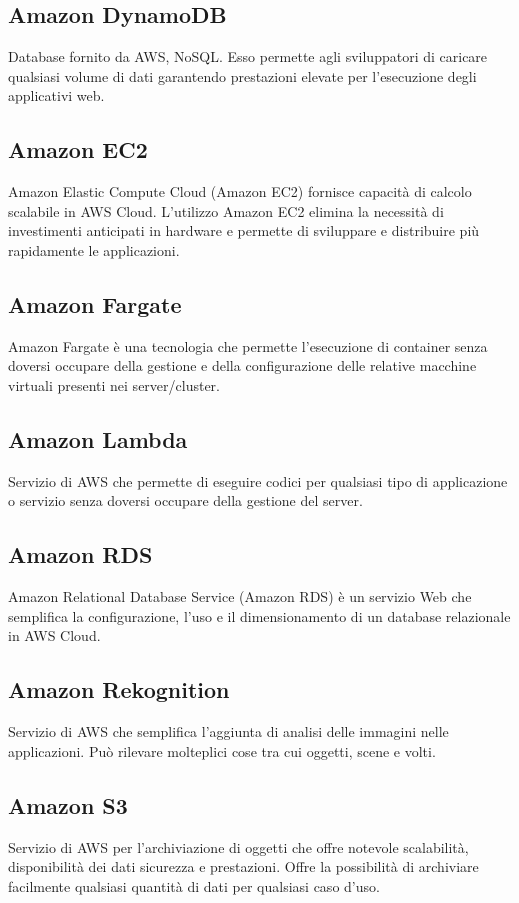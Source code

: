 \documentclass{classes/base}
\begin{document}
        \subsection*{Amazon DynamoDB}
        Database fornito da AWS, NoSQL. Esso permette agli sviluppatori di caricare qualsiasi volume di dati garantendo prestazioni elevate per l'esecuzione degli applicativi web.

        \subsection*{Amazon EC2}
        Amazon Elastic Compute Cloud (Amazon EC2) fornisce capacità di calcolo scalabile in AWS Cloud. L'utilizzo Amazon EC2 elimina la necessità di investimenti anticipati in hardware e permette di sviluppare e distribuire più rapidamente le applicazioni.

        \subsection*{Amazon Fargate}
        Amazon Fargate è una tecnologia che permette l'esecuzione di container senza doversi occupare della gestione e della configurazione delle relative macchine virtuali presenti nei server/cluster. 

        \subsection*{Amazon Lambda}
        Servizio di AWS che permette di eseguire codici per qualsiasi tipo di applicazione o servizio senza doversi occupare della gestione del server.

        \subsection*{Amazon RDS}
        Amazon Relational Database Service (Amazon RDS) è un servizio Web che semplifica la configurazione, l'uso e il dimensionamento di un database relazionale in AWS Cloud.

        \subsection*{Amazon Rekognition}
        Servizio di AWS che semplifica l'aggiunta di analisi delle immagini nelle applicazioni. Può rilevare molteplici cose tra cui oggetti, scene e volti.

        \subsection*{Amazon S3}
        \label{sec:S3}
        Servizio di AWS per l'archiviazione di oggetti che offre notevole scalabilità, disponibilità dei dati sicurezza e prestazioni. Offre la possibilità di archiviare facilmente qualsiasi quantità di dati per qualsiasi caso d'uso.
        
\end{document}
